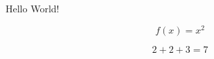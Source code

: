 \documentclass{article}
\begin{document}
  Hello World!
  
\begin{equation*}
  f(x) = x^2
\end{equation*}

\begin{equation*}
 2+2+3 = 7
\end{equation*}
\end{document}
